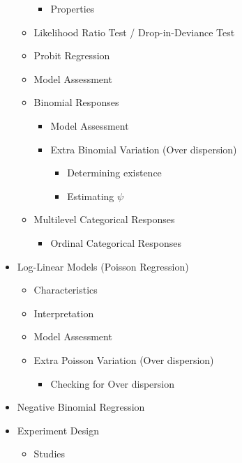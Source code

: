 \documentclass[11pt]{article}
\begin{document}
\begin{itemize}
\begin{itemize}
\begin{itemize}
\item Properties
\end{itemize}

\item Likelihood Ratio Test / Drop-in-Deviance Test
\item Probit Regression
\item Model Assessment
\item Binomial Responses

\begin{itemize}
\item Model Assessment
\item Extra Binomial Variation (Over dispersion)

\begin{itemize}
\item Determining existence
\item Estimating \(\psi\)
\end{itemize}
\end{itemize}

\item Multilevel Categorical Responses

\begin{itemize}
\item Ordinal Categorical Responses
\end{itemize}
\end{itemize}

\item Log-Linear Models (Poisson Regression)

\begin{itemize}
\item Characteristics
\item Interpretation
\item Model Assessment
\item Extra Poisson Variation (Over dispersion)

\begin{itemize}
\item Checking for Over dispersion
\end{itemize}
\end{itemize}

\item Negative Binomial Regression
\item Experiment Design

\begin{itemize}
\item Studies


\end{itemize}
\end{itemize}
\end{document}
